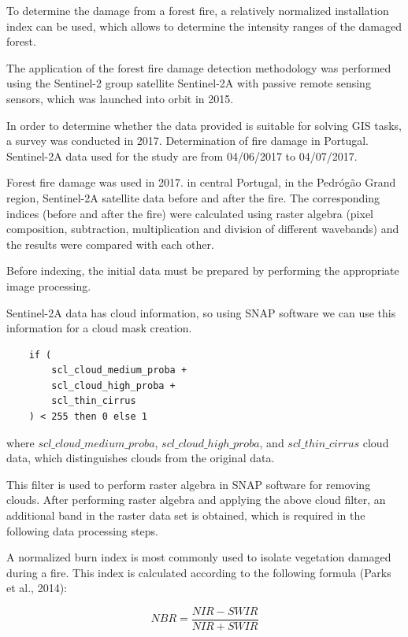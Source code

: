 	To determine the damage from a forest fire, a relatively normalized installation index can be used, which allows to determine the intensity ranges of the damaged forest.
	
	The application of the forest fire damage detection methodology was performed using the Sentinel-2 group satellite Sentinel-2A with passive remote sensing sensors, which was launched into orbit in 2015.
	
	In order to determine whether the data provided is suitable for solving GIS tasks, a survey was conducted in 2017. Determination of fire damage in Portugal. Sentinel-2A data used for the study are from 04/06/2017 to 04/07/2017.
	
	Forest fire damage was used in 2017. in central Portugal, in the Pedrógão Grand region, Sentinel-2A satellite data before and after the fire. The corresponding indices (before and after the fire) were calculated using raster algebra (pixel composition, subtraction, multiplication and division of different wavebands) and the results were compared with each other.
	
	Before indexing, the initial data must be prepared by performing the appropriate image processing.
	
	Sentinel-2A data has cloud information, so using SNAP software we can use this information for a cloud mask creation.
	
	\begin{lstlisting}
	if (
		scl_cloud_medium_proba + 
		scl_cloud_high_proba +                                                			      
		scl_thin_cirrus
	) < 255 then 0 else 1
	\end{lstlisting}
	
	where $scl\_cloud\_medium\_proba$, $scl\_cloud\_high\_proba$, and $scl\_thin\_cirrus$ cloud data, which distinguishes clouds from the original data.
	
	This filter is used to perform raster algebra in SNAP software for removing clouds. After performing raster algebra and applying the above cloud filter, an additional band in the raster data set is obtained, which is required in the following data processing steps.
	
	A normalized burn index is most commonly used to isolate vegetation damaged during a fire. This index is calculated according to the following formula (Parks et al., 2014):
	
	\begin{equation}
	NBR=\dfrac{NIR - SWIR}{NIR + SWIR}
	\end{equation}
	
